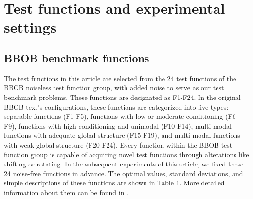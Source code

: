 \documentclass{article}
\begin{document}
\section{Test functions and experimental settings}
\subsection{BBOB benchmark functions}

\hspace{2em}The test functions in this article are selected from the 24 test functions of the BBOB noiseless test function group, with added noise to serve as our test benchmark problems. These functions are designated as F1-F24. In the original BBOB text's configurations, these functions are categorized into five types: separable functions (F1-F5), functions with low or moderate conditioning (F6-F9), functions with high conditioning and unimodal (F10-F14), multi-modal functions with adequate global structure (F15-F19), and multi-modal functions with weak global structure (F20-F24). Every function within the BBOB test function group is capable of acquiring novel test functions through alterations like shifting or rotating. In the subsequent experiments of this article, we fixed these 24 noise-free functions in advance. The optimal values, standard deviations, and simple descriptions of these functions are shown in Table 1. More detailed information about them can be found in \citep{Hansen2010RealParameterBO}.
\end{document}
